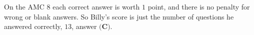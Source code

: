 On the AMC 8 each correct answer is worth $1$ point, and there is no penalty for wrong or blank answers. So Billy's score is just the number of questions he answered correctly, $\boxed{13}$, answer $\textbf{(C)}$.
